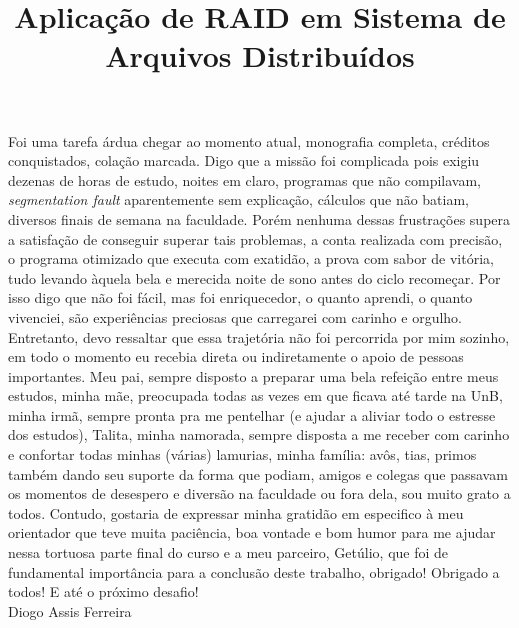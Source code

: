\documentclass[bacharelado]{unb-cic}
\title{Aplicação de RAID em Sistema de Arquivos Distribuídos}
\begin{document}
\maketitle

\pretextual

\begin{agradecimentos}
Foi uma tarefa árdua chegar ao momento atual, monografia completa, créditos conquistados, colação marcada. Digo que a missão foi complicada pois exigiu dezenas de horas de estudo, noites em claro, programas que não compilavam, \textit{segmentation fault} aparentemente sem explicação, cálculos que não batiam, diversos finais de semana na faculdade. Porém nenhuma dessas frustrações supera a satisfação de conseguir superar tais problemas, a conta realizada com precisão, o programa otimizado que executa com exatidão, a prova com sabor de vitória, tudo levando àquela bela e merecida noite de sono antes do ciclo recomeçar. Por isso digo que não foi fácil, mas foi enriquecedor, o quanto aprendi, o quanto vivenciei, são experiências preciosas que carregarei com carinho e orgulho. Entretanto, devo ressaltar que essa trajetória não foi percorrida por mim sozinho, em todo o momento eu recebia direta ou indiretamente o apoio de pessoas importantes. Meu pai, sempre disposto a preparar uma bela refeição entre meus estudos, minha mãe, preocupada todas as vezes em que ficava até tarde na UnB, minha irmã, sempre pronta pra me pentelhar (e ajudar a aliviar todo o estresse dos estudos), Talita, minha namorada, sempre disposta a me receber com carinho e confortar todas minhas (várias) lamurias, minha família: avôs, tias, primos também dando seu suporte da forma que podiam, amigos e colegas que passavam os momentos de desespero e diversão na faculdade ou fora dela, sou muito grato a todos. Contudo, gostaria de expressar minha gratidão em especifico à meu orientador que teve muita paciência, boa vontade e bom humor para me ajudar nessa tortuosa parte final do curso e a meu parceiro, Getúlio, que foi de fundamental importância para a conclusão deste trabalho, obrigado! Obrigado a todos! E até o próximo desafio!
\\

Diogo Assis Ferreira
\\

\end{agradecimentos}
\end{document}
